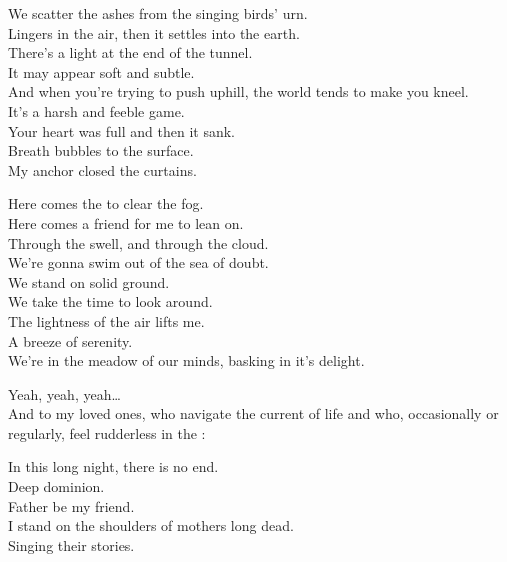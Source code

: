 
We scatter the ashes from the singing birds' urn. \\
Lingers in the air, then it settles into the earth. \\
There's a light at the end of the tunnel. \\
It may appear soft and subtle. \\
And when you're trying to push uphill, the world tends to make you kneel. \\
It's a harsh and feeble game. \\
Your heart was full and then it sank. \\
Breath bubbles to the surface. \\
My anchor closed the curtains. \\


Here comes the  to clear the fog. \\
Here comes a friend for me to lean on. \\
Through the swell, and through the cloud. \\
We're gonna swim out of the sea of doubt. \\

We stand on solid ground. \\
We take the time to look around. \\
The lightness of the air lifts me. \\
A breeze of serenity. \\
We're in the meadow of our minds, basking in it's delight. \\





Yeah, yeah, yeah… \\
And to my loved ones, who navigate the current of life and who, occasionally or regularly, feel rudderless in the : \\


In this long night, there is no end. \\
Deep dominion. \\
Father be my friend. \\
I stand on the shoulders of mothers long dead. \\
Singing their stories. \\

